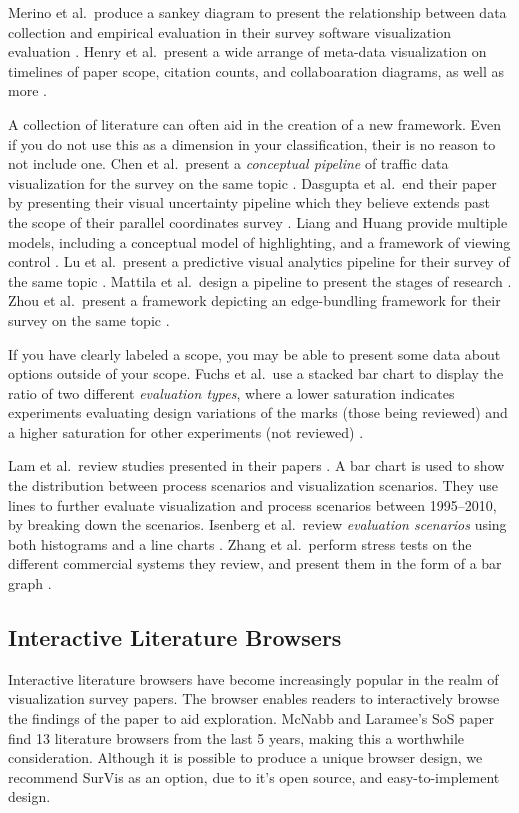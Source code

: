 Merino et al.\ produce a sankey diagram to present the relationship between data collection and empirical evaluation in their survey software visualization evaluation \cite{merino2018systematic}.
Henry et al.\ present a  wide arrange of meta-data visualization on timelines of paper scope, citation counts, and collaboaration diagrams, as well as more \cite{henry200720}.

A collection of literature can often aid in the creation of a new framework. Even if you do not use this as a dimension in your classification, their is no reason to not include one. Chen et al.\ present a \textit{conceptual pipeline} of traffic data visualization for the survey on the same topic \cite{chen2015survey}. Dasgupta et al.\ end their paper by presenting their visual uncertainty pipeline which they believe extends past the scope of their parallel coordinates survey \cite{dasgupta2012conceptualizing}. Liang and Huang provide multiple models, including a conceptual model of highlighting, and a framework of viewing control \cite{liang2010highlighting}. Lu et al.\  present a predictive visual analytics pipeline for their survey of the same topic \cite{lu2016recent}.  Mattila et al.\ design a pipeline to present the stages of research \cite{mattila2016software}. Zhou et al.\ present a framework depicting an edge-bundling framework for their survey on the same topic \cite{zhou2013edge}.

If you have clearly labeled a scope, you may be able to present some data about options outside of your scope. Fuchs et al.\ use a stacked bar chart to display the ratio of two different \textit{evaluation types}, where a lower saturation indicates experiments evaluating design variations of the marks (those being reviewed) and a higher saturation for other experiments (not reviewed) \cite{fuchs2016systematic}.

 Lam et al.\ review studies presented in their papers  \cite{lam2012empirical}. A bar chart is used to show the distribution between process scenarios and visualization scenarios. They use lines to further evaluate visualization and process scenarios between 1995--2010, by breaking down the scenarios.
Isenberg et al.\ review \textit{evaluation scenarios} using both histograms and a line charts \cite{isenberg2013systematic}.
Zhang et al.\ perform stress tests on the different commercial systems they review, and present them in the form of a bar graph \cite{zhang2012visual}.
 

\subsection{Interactive Literature Browsers}
Interactive literature browsers have become increasingly popular in the realm of visualization survey papers. The browser enables readers to interactively browse the findings of the paper to aid exploration. McNabb and Laramee's SoS paper find 13 literature browsers from the last 5 years, making this a worthwhile consideration.  Although it is possible to produce a unique browser design, we recommend SurVis \cite{beck2016visual} as an option, due to it's open source, and easy-to-implement design.

